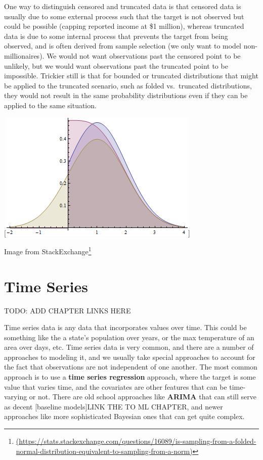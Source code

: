 \documentclass[
  letterpaper,
]{krantz}
\DeclareRobustCommand{\href}[2]{#2\footnote{\url{#1}}}
\begin{document}
\begin{tcolorbox}[enhanced jigsaw, bottomrule=.15mm, rightrule=.15mm, colframe=quarto-callout-note-color-frame, colback=white, breakable, arc=.35mm, left=2mm, opacityback=0, leftrule=.75mm, toprule=.15mm]

One way to distinguish censored and truncated data is that censored data
is usually due to some external process such that the target is not
observed but could be possible (capping reported income at \$1 million),
whereas truncated data is due to some internal process that prevents the
target from being observed, and is often derived from sample selection
(we only want to model non-millionaires). We would not want observations
past the censored point to be unlikely, but we would want observations
past the truncated point to be impossible. Trickier still is that for
bounded or truncated distributions that might be applied to the
truncated scenario, such as folded vs.~truncated distributions, they
would not result in the same probability distributions even if they can
be applied to the same situation.

{[}\includegraphics{img/trunc_vs_folded.png}{]}

Image from
\href{(https://stats.stackexchange.com/questions/16089/is-sampling-from-a-folded-normal-distribution-equivalent-to-sampling-from-a-norm)}{StackExchange}

\end{tcolorbox}

\section{Time Series}\label{sec-data-time}

TODO: ADD CHAPTER LINKS HERE

Time series data is any data that incorporates values over time. This
could be something like the a state's population over years, or the max
temperature of an area over days, etc. Time series data is very common,
and there are a number of approaches to modeling it, and we usually take
special approaches to account for the fact that observations are not
independent of one another. The most common approach is to use a
\textbf{time series regression} approach, where the target is some value
that varies time, and the covariates are other features that can be
time-varying or not. There are old school approaches like \textbf{ARIMA}
that can still serve as decent {[}baseline models{]}LINK THE TO ML
CHAPTER, and newer approaches like more sophisticated Bayesian ones that
can get quite complex.
\end{document}
